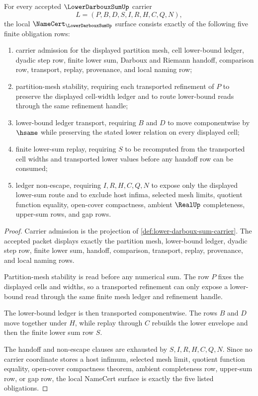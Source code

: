 \begin{theorem}\label{thm:lower-darboux-sum-namecert-obligations}
For every accepted $\LowerDarbouxSumUp$ carrier
$$
L=(P,B,D,S,I,R,H,C,Q,N),
$$
the local $\NameCert_{\LowerDarbouxSumUp}$ surface consists exactly of the following five finite obligation rows:
\begin{enumerate}
\item carrier admission for the displayed partition mesh, cell lower-bound ledger, dyadic step row, finite lower sum, Darboux and Riemann handoff, comparison row, transport, replay, provenance, and local naming row;
\item partition-mesh stability, requiring each transported refinement of $P$ to preserve the displayed cell-width ledger and to route lower-bound reads through the same refinement handle;
\item lower-bound ledger transport, requiring $B$ and $D$ to move componentwise by $\hsame$ while preserving the stated lower relation on every displayed cell;
\item finite lower-sum replay, requiring $S$ to be recomputed from the transported cell widths and transported lower values before any handoff row can be consumed;
\item ledger non-escape, requiring $I,R,H,C,Q,N$ to expose only the displayed lower-sum route and to exclude host infima, selected mesh limits, quotient function equality, open-cover compactness, ambient $\RealUp$ completeness, upper-sum rows, and gap rows.
\end{enumerate}
\end{theorem}
\begin{proof}
Carrier admission is the projection of \autoref{def:lower-darboux-sum-carrier}. The accepted packet displays exactly the partition mesh, lower-bound ledger, dyadic step row, finite lower sum, handoff, comparison, transport, replay, provenance, and local naming rows.

Partition-mesh stability is read before any numerical sum. The row $P$ fixes the displayed cells and widths, so a transported refinement can only expose a lower-bound read through the same finite mesh ledger and refinement handle.

The lower-bound ledger is then transported componentwise. The rows $B$ and $D$ move together under $H$, while replay through $C$ rebuilds the lower envelope and then the finite lower sum row $S$.

The handoff and non-escape clauses are exhausted by $S,I,R,H,C,Q,N$. Since no carrier coordinate stores a host infimum, selected mesh limit, quotient function equality, open-cover compactness theorem, ambient completeness row, upper-sum row, or gap row, the local NameCert surface is exactly the five listed obligations.
\end{proof}

